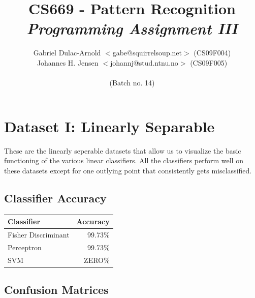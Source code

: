 \documentclass[a4paper]{article}
\author{Gabriel Dulac-Arnold $<$gabe@squirrelsoup.net$>$ (CS09F004) \\
Johannes H. Jensen $<$johannj@stud.ntnu.no$>$ (CS09F005) \\
\\
(Batch no. 14)}
\title{CS669 - Pattern Recognition\\
\emph{Programming Assignment III}}
\begin{document}
\setlength{\parskip}{2ex}
\setlength{\tabcolsep}{8pt}
\renewcommand\arraystretch{1.5}
\maketitle

\section{Dataset I: Linearly Separable}

These are the linearly seperable datasets that allow us to visualize the basic functioning of the various linear classifiers.
All the classifiers perform well on these datasets except for one outlying point that consistently gets misclassified.

\subsection{Classifier Accuracy}

\begin{tabular}{ | l | r | }
\hline
\textbf{Classifier} & \textbf{Accuracy} \\
\hline
Fisher Discriminant  &   99.73\% \\
\hline
Perceptron          &   99.73\% \\
\hline
SVM                 &   ZERO\%   \\
\hline
\end{tabular}


\subsection{Confusion Matrices}
\end{document}
